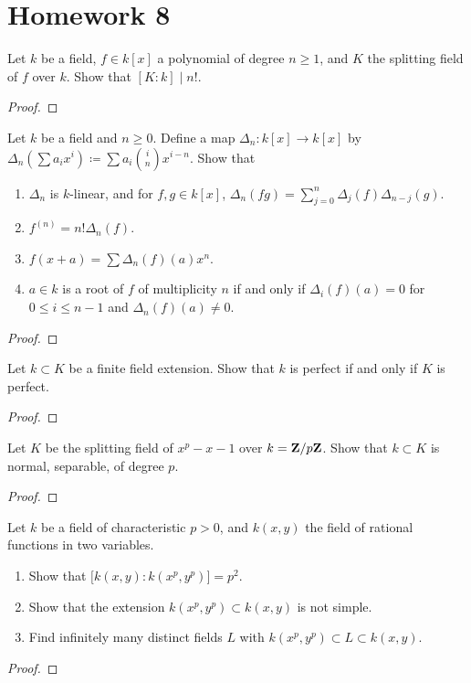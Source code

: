 \chapter{Homework 8}
\begin{problem}
Let $k$ be a field, $f\in k[x]$ a polynomial of degree $n\geq 1$, and $K$
the splitting field of $f$ over $k$. Show that $[K:k]\mid n!$.
\end{problem}
\begin{proof}
\end{proof}

\begin{problem}
Let $k$ be a field and $n\geq 0$. Define a map $\Delta_n\colon k[x]\to
k[x]$ by $\Delta_n\left(\sum a_ix^i\right)\coloneqq\sum a_i\binom{i}{n}
x^{i-n}$. Show that
\begin{enumerate}[label=(\alph*)]
\item $\Delta_n$ is $k$-linear, and for $f,g\in k[x]$,
  $\Delta_n(fg)=\sum_{j=0}^n\Delta_j(f)\Delta_{n-j}(g)$.
\item $f^{(n)}=n!\Delta_n(f)$.
\item $f(x+a)=\sum\Delta_n(f)(a)x^n$.
\item $a\in k$ is a root of $f$ of multiplicity $n$ if and only if
  $\Delta_i(f)(a)=0$ for $0\leq i\leq n-1$ and $\Delta_n(f)(a)\neq 0$.
\end{enumerate}
\end{problem}
\begin{proof}
\end{proof}

\begin{problem}
Let $k\subset K$ be a finite field extension. Show that $k$ is perfect if
and only if $K$ is perfect.
\end{problem}
\begin{proof}
\end{proof}

\begin{problem}
Let $K$ be the splitting field of $x^p-x-1$ over $k=\mathbf{Z}/p\mathbf{Z}$. Show that
$k\subset K$ is normal, separable, of degree $p$.
\end{problem}
\begin{proof}
\end{proof}

\begin{problem}
Let $k$ be a field of characteristic $p>0$, and $k(x,y)$ the field of
rational functions in two variables.
\begin{enumerate}[label=(\alph*)]
\item Show that $\bigl[k(x,y):k(x^p,y^p)\bigr]=p^2$.
\item Show that the extension $k(x^p,y^p)\subset k(x,y)$ is not simple.
\item Find infinitely many distinct fields $L$ with $k(x^p,y^p)\subset
  L\subset k(x,y)$.
\end{enumerate}
\end{problem}
\begin{proof}
\end{proof}


